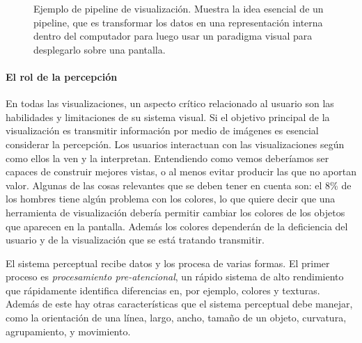 \documentclass[12pt]{article}
\begin{document}
\begin{figure}[h] %
\caption[Pipeline de visualización]{Ejemplo de pipeline de visualización. Muestra la idea esencial de un pipeline, que es transformar los datos en una representación interna dentro del computador para luego usar un paradigma visual para desplegarlo sobre una pantalla.}
\label{fig:pipeline_visualizacion}
\end{figure}




\paragraph{El rol de la percepción}

En todas las visualizaciones, un aspecto crítico relacionado al usuario son las habilidades y limitaciones de su sistema visual. Si el objetivo principal de la visualización es transmitir información por medio de imágenes es esencial considerar la percepción. Los usuarios interactuan con las visualizaciones según como ellos la ven y la interpretan. Entendiendo como vemos deberíamos ser capaces de construir mejores vistas, o al menos evitar producir las que no aportan valor. Algunas de las cosas relevantes que se deben tener en cuenta son: el 8\% de los hombres tiene algún problema con los colores, lo que quiere decir que una herramienta de visualización debería permitir cambiar los colores de los objetos que aparecen en la pantalla. Además los colores dependerán de la deficiencia del usuario y de la visualización que se está tratando transmitir.


El sistema perceptual recibe datos y los procesa de varias formas. El primer proceso es \textit{procesamiento pre-atencional}, un rápido sistema de alto rendimiento que rápidamente identifica diferencias en, por ejemplo, colores y texturas. Además de este hay otras características que el sistema perceptual debe manejar, como la orientación de una línea, largo, ancho, tamaño de un objeto, curvatura, agrupamiento, y movimiento.
\end{document}

